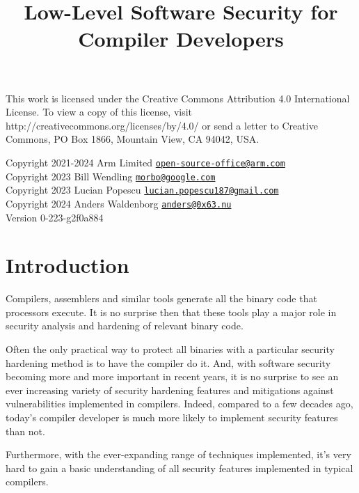 \documentclass[
  a4paper,
]{report}
\title{Low-Level Software Security for Compiler Developers}
\author{}
\date{}
\begin{document}
\maketitle

\clearpage

\vspace*{\fill}
This work is licensed under the Creative Commons Attribution 4.0 International
License. To view a copy of this license, visit
http://creativecommons.org/licenses/by/4.0/ or send a letter to Creative
Commons, PO Box 1866, Mountain View, CA 94042, USA.

  Copyright 2021-2024 Arm Limited
\href{mailto:open-source-office@arm.com}{\nolinkurl{open-source-office@arm.com}}\\
  Copyright 2023 Bill Wendling
\href{mailto:morbo@google.com}{\nolinkurl{morbo@google.com}}\\
  Copyright 2023 Lucian Popescu
\href{mailto:lucian.popescu187@gmail.com}{\nolinkurl{lucian.popescu187@gmail.com}}\\
  Copyright 2024 Anders Waldenborg
\href{mailto:anders@0x63.nu}{\nolinkurl{anders@0x63.nu}}\\

Version 0-223-g2f0a884
\clearpage

{
\hypersetup{linkcolor=}
\setcounter{tocdepth}{2}
\tableofcontents
}
\chapter{Introduction}\label{introduction}

Compilers, assemblers and similar tools generate all the binary code
that processors execute. It is no surprise then that these tools play a
major role in security analysis and hardening of relevant binary code.

Often the only practical way to protect all binaries with a particular
security hardening method is to have the compiler do it. And, with
software security becoming more and more important in recent years, it
is no surprise to see an ever increasing variety of security hardening
features and mitigations against vulnerabilities implemented in
compilers. Indeed, compared to a few decades ago, today's compiler
developer is much more likely to implement security features than not.

Furthermore, with the ever-expanding range of techniques implemented,
it's very hard to gain a basic understanding of all security features
implemented in typical compilers.
\end{document}
